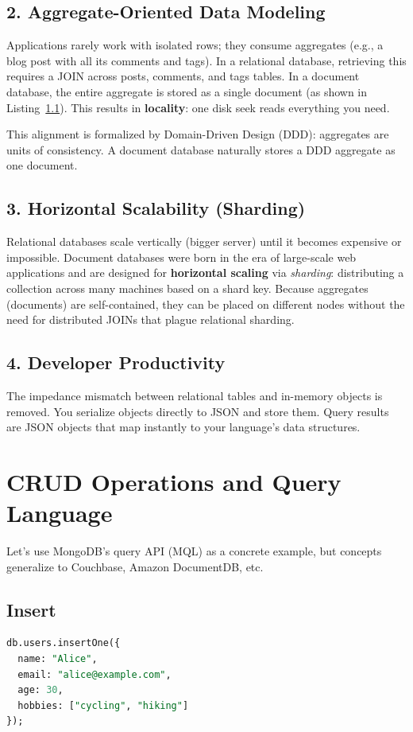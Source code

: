 \documentclass[12pt,a4paper]{article}
\begin{document}
\subsection{2. Aggregate-Oriented Data Modeling}
Applications rarely work with isolated rows; they consume aggregates (e.g., a blog post with all its comments and tags). In a relational database, retrieving this requires a JOIN across posts, comments, and tags tables. In a document database, the entire aggregate is stored as a single document (as shown in Listing~\ref{}). This results in \textbf{locality}: one disk seek reads everything you need.

This alignment is formalized by Domain-Driven Design (DDD): aggregates are units of consistency. A document database naturally stores a DDD aggregate as one document.

\subsection{3. Horizontal Scalability (Sharding)}
Relational databases scale vertically (bigger server) until it becomes expensive or impossible. Document databases were born in the era of large-scale web applications and are designed for \textbf{horizontal scaling} via \textit{sharding}: distributing a collection across many machines based on a shard key. Because aggregates (documents) are self-contained, they can be placed on different nodes without the need for distributed JOINs that plague relational sharding.

\subsection{4. Developer Productivity}
The impedance mismatch between relational tables and in-memory objects is removed. You serialize objects directly to JSON and store them. Query results are JSON objects that map instantly to your language's data structures.

\section{CRUD Operations and Query Language}
Let's use MongoDB's query API (MQL) as a concrete example, but concepts generalize to Couchbase, Amazon DocumentDB, etc.

\subsection{Insert}
\begin{lstlisting}[language=SQL, caption=Insert a document (JavaScript shell syntax)]
db.users.insertOne({
  name: "Alice",
  email: "alice@example.com",
  age: 30,
  hobbies: ["cycling", "hiking"]
});
\end{lstlisting}
\end{document}
